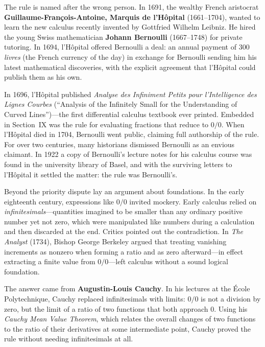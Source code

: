 \begin{historybox}
The rule is named after the wrong person. In
1691, the wealthy French aristocrat \textbf{Guillaume-Fran\c{c}ois-Antoine, Marquis de
l'H\^opital} (1661--1704), wanted to learn the new calculus recently invented
by Gottfried Wilhelm Leibniz. He hired the young
Swiss mathematician \textbf{Johann Bernoulli} (1667--1748) for private tutoring. In
1694, l'H\^opital offered Bernoulli a deal: an annual
payment of 300 \emph{livres} (the French currency of the day) in exchange for Bernoulli
sending him his
latest mathematical discoveries, with the explicit agreement that l'H\^opital could
publish them as his own.

In 1696, l'H\^opital published \emph{Analyse des Infiniment Petits pour l'Intelligence
des Lignes Courbes} (``Analysis of the Infinitely Small for the Understanding of Curved
Lines'')---the first differential calculus textbook ever printed. Embedded in
Section~IX was the rule for evaluating fractions that reduce to $0/0$. When
l'H\^opital died in 1704, Bernoulli went public, claiming full authorship of the rule.
For over two centuries, many historians dismissed Bernoulli as an envious
claimant. In 1922 a copy of Bernoulli's lecture notes for his calculus course was
found in the university library of Basel, and with the surviving letters to
l'H\^opital it settled the matter: the rule was Bernoulli's.

Beyond the priority dispute lay an argument about foundations. In the early
eighteenth century, expressions like $0/0$ invited mockery. Early calculus relied on
\emph{infinitesimals}---quantities imagined to be smaller than any ordinary positive
number yet not zero, which were manipulated like numbers during a calculation
and then discarded at the end. Critics pointed out the contradiction. In
\emph{The Analyst} (1734), Bishop George Berkeley argued that treating vanishing
increments as nonzero when forming a ratio and as zero afterward---in effect
extracting a finite value from $0/0$---left calculus without a sound logical foundation.

The answer came from \textbf{Augustin-Louis Cauchy}. In his
lectures at the \'Ecole Polytechnique, Cauchy replaced infinitesimals with
limits: $0/0$ is not a division by zero, but the limit
of a ratio of two functions that both approach $0$. Using his
\emph{Cauchy Mean Value Theorem}, which relates the overall changes of two functions to
the ratio of their derivatives at some intermediate point, Cauchy proved
the rule without needing infinitesimals at all.


\end{historybox}
